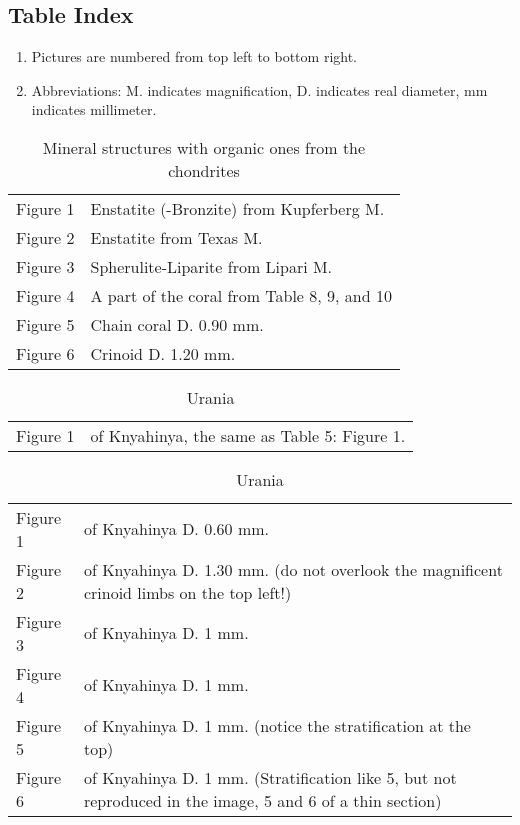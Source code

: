 \documentclass[a4paper, 11pt, oneside]{article}
\begin{document}
\subsection{Table Index}
\begin{enumerate}
    \item Pictures are numbered from top left to bottom right.
    \item Abbreviations: M. indicates magnification, D. indicates real diameter, mm indicates millimeter.
\end{enumerate}
\begin{table}[h!]
\caption{Mineral structures with organic ones from the chondrites}
\centering
\begin{tabular}{ p{1.5cm} p{10cm} }
\hline
 Figure 1 & Enstatite (-Bronzite) from Kupferberg M. \\
 Figure 2 & Enstatite from Texas M. \\
 Figure 3 & Spherulite-Liparite from Lipari M. \\
 Figure 4 & A part of the coral from Table 8, 9, and 10 \\
 Figure 5 & Chain coral D. 0.90 mm. \\
 Figure 6 & Crinoid D. 1.20 mm.
\end{tabular}
\label{table:1}
\end{table}
\begin{table}[h!]
\caption{Urania}
\centering
\begin{tabular}{ p{1.5cm} p{10cm} }
\hline
 Figure 1 & of Knyahinya, the same as Table 5: Figure 1.
\end{tabular}
\label{table:2}
\end{table}
\begin{table}[h!]
\caption{Urania}
\centering
\begin{tabular}{ p{1.5cm} p{10cm} }
\hline
 Figure 1 & of Knyahinya D. 0.60 mm. \\
 Figure 2 & of Knyahinya D. 1.30 mm. (do not overlook the magnificent crinoid limbs on the top left!) \\
 Figure 3 & of Knyahinya D. 1 mm. \\
 Figure 4 & of Knyahinya D. 1 mm. \\
 Figure 5 & of Knyahinya D. 1 mm. (notice the stratification at the top) \\
 Figure 6 & of Knyahinya D. 1 mm. (Stratification like 5, but not reproduced in the image, 5 and 6 of a thin section)
\end{tabular}
\label{table:3}
\end{table}
\end{document}
